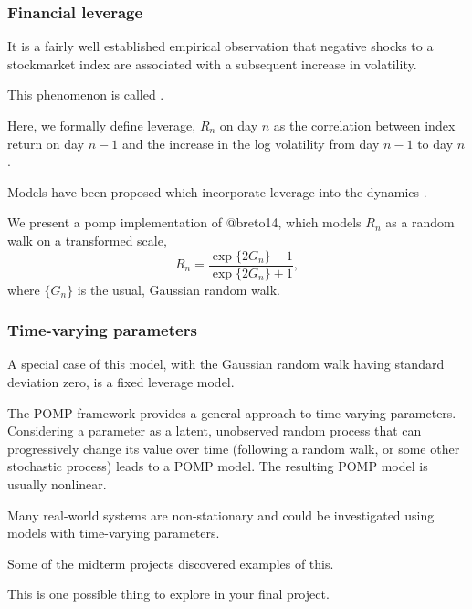 \documentclass{beamer}
\begin{document}
\begin{frame}[fragile]


\frametitle{Financial leverage}

\bi

\item It is a fairly well established empirical observation that negative shocks to a stockmarket index are associated with a subsequent increase in volatility. 

\item This phenomenon is called .

\item Here, we formally define leverage, $R_n$ on day $n$ as the correlation between index return on day $n-1$ and the increase in the log volatility from day $n-1$ to day $n$.

\item Models have been proposed which incorporate leverage into the dynamics \citep{breto14}.

\item We present a pomp implementation of @breto14, which models $R_n$ as a random walk on a transformed scale,
$$R_n= \frac{\exp\{2G_n\} -1}{\exp\{2G_n\}+1},$$
where $\{G_n\}$ is the usual, Gaussian random walk.

\ei

\end{frame}

\begin{frame}[fragile]


\frametitle{Time-varying parameters}

\bi

\item A special case of this model, with the Gaussian random walk having standard deviation zero, is a fixed leverage model.

\item The POMP framework provides a general approach to time-varying parameters. Considering a parameter as a latent, unobserved random process that can progressively change its value over time (following a random walk, or some other stochastic process) leads to a POMP model. The resulting POMP model is usually nonlinear.

\item Many real-world systems are non-stationary and could be investigated using models with time-varying parameters. 

\item Some of the midterm projects discovered examples of this.

\item This is one possible thing to explore in your final project.

\ei

\end{frame}
\end{document}
